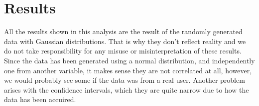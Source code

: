 \documentclass{article}\usepackage[]{graphicx}\usepackage[]{xcolor}
\begin{document}
\section{Results}
All the results shown in this analysis are the result of the randomly generated data with Gaussian distributions. That is why they don't reflect reality and we do not take responsibility for any misuse or misinterpretation of these results.
\\Since the data has been generated using a normal distribution, and independently one from another variable, it makes sense they are not correlated at all, however, we would probably see some if the data was from a real user. Another problem arises with the confidence intervals, which they are quite narrow due to how the data has been accuired.
\end{document}
